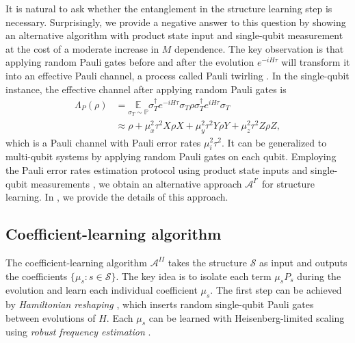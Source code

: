 \documentclass[twocolumn,superscriptaddress,aps,showpacs,amsmath,amstex,amssymb,citeautoscript,floatfix,pra,preprintnumbers]{revtex4-2}
\newcounter{alg}
\theoremstyle{plain}
\theoremstyle{plain}
\theoremstyle{plain}
\theoremstyle{plain}
\theoremstyle{plain}
\theoremstyle{plain}
\newcommand{\eqs}[1]{\begin{equation}\begin{split}#1\end{split}\end{equation}}
\begin{document}
It is natural to ask whether the entanglement in the structure learning step is necessary. Surprisingly, we provide a negative answer to this question by showing an alternative algorithm with product state input and single-qubit measurement at the cost of a moderate increase in $M$ dependence. The key observation is that applying random Pauli gates before and after the evolution $e^{-iH\tau}$ will transform it into an effective Pauli channel, a process called Pauli twirling \cite{RC,SymmetrizedNoise,PauliNoise,PEC,PEC2}. In the single-qubit instance, the effective channel after applying random Pauli gates is
\eqs{
\Lambda_P(\rho)&=\underset{\sigma_T\sim \mathbb{P}}{\mathbb{E}}\sigma_T^{\dagger}e^{-iH\tau}\sigma_T \rho\sigma_T^{\dagger}e^{iH\tau}\sigma_T\\
&\approx \rho+\mu_x^2\tau^2 X\rho X+\mu_y^2\tau^2 Y\rho Y+\mu_z^2\tau^2 Z\rho Z,
}
which is a Pauli channel with Pauli error rates $\mu_i^2\tau^2$. It can be generalized to multi-qubit systems by applying random Pauli gates on each qubit. Employing the Pauli error rates estimation protocol using product state inputs and single-qubit measurements \cite{Flammia2021paulierror}, we obtain an alternative approach $\mathcal{A}^{I'}$ for structure learning. In , we provide the details of this approach. 





\subsection{Coefficient-learning algorithm}
\label{sec:Coefficient-learning algorithm}
The coefficient-learning algorithm $\mathcal{A}^{II}$ takes the structure $\mathcal{S}$ as input and outputs the coefficients $\{\mu_s:s\in \mathcal{S}\}$. The key idea is to isolate each term $\mu_s P_s$ during the evolution and learn each individual coefficient $\mu_s$. The first step can be achieved by \emph{Hamiltonian reshaping} \cite{HuangTongFangSu2023learning,ma2024learningkbodyhamiltonianscompressed}, which inserts random single-qubit Pauli gates between evolutions of $H$. Each $\mu_s$ can be learned with Heisenberg-limited scaling using \emph{robust frequency estimation} \cite{KimmelLowYoder2015robust,ma2024learningkbodyhamiltonianscompressed}. 
\end{document}
